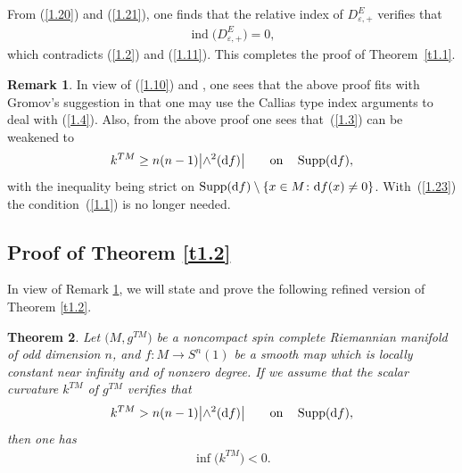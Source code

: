\documentclass[10pt,a4paper]{amsart}
\numberwithin{equation}{section}
\newtheorem{thm}{Theorem}[section]
\theoremstyle{definition}
\newtheorem{rem}[thm]{Remark}
\begin{document}
From (\ref{1.20}) and (\ref{1.21}), one finds that the relative index of $D^E_{\varepsilon,+}$ verifies that
\begin{gather*}%
\operatorname{ind}\big(D^E_{\varepsilon,+}\big)=0,
\end{gather*}
which contradicts (\ref{1.2}) and (\ref{1.11}). This completes the proof of Theorem~\ref{t1.1}.

\begin{rem}\label{t1.3}
In view of (\ref{1.10}) and \cite[Section~6$\frac{4}{5}$]{Gr96}, one sees that the above proof fits with Gromov's suggestion in \cite[p.~45]{Gr19} that one may use the Callias type index arguments to deal with (\ref{1.4}). Also, from the above proof one sees that~(\ref{1.3}) can be weakened to
\begin{gather}\label{1.23}
k^{TM}\geq n(n-1)\big|{\wedge}^2({\rm d}f)\big| \qquad {\rm on}\quad \operatorname{Supp}({\rm d}f),
\end{gather}
with the inequality being strict on $\operatorname{Supp}({\rm d}f)\setminus \{x\in M\colon {\rm d}f(x)\neq 0\}$. With~(\ref{1.23}) the condition~(\ref{1.1}) is no longer needed.
\end{rem}

\subsection{Proof of Theorem \ref{t1.2}}\label{s1.3}

In view of Remark \ref{t1.3}, we will state and prove the following refined version of Theorem \ref{t1.2}.


\begin{thm}\label{t1.4} Let $\big(M,g^{TM}\big)$ be a noncompact spin complete Riemannian manifold of odd dimension $n$, and $f\colon M\rightarrow S^n(1)$ be a smooth map which is locally constant near infinity and of nonzero degree. If we assume that the scalar curvature $k^{TM}$ of $g^{TM}$ verifies that
\begin{gather}\label{1.24}
k^{TM}> n(n-1)\big|{\wedge}^2({\rm d}f)\big| \qquad {\rm on}\quad \operatorname{Supp}({\rm d}f),
\end{gather}
then one has
\begin{gather}\label{1.25}
\inf\big(k^{TM}\big)<0.
\end{gather}
\end{thm}
\end{document}
